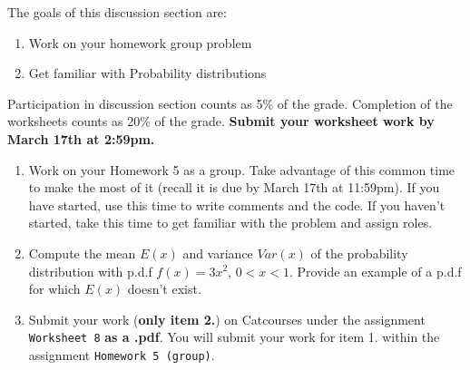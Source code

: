 \documentclass[11pt]{article}
\begin{document}
The goals of this discussion section are: 

\begin{enumerate}
\item Work on your homework group problem
\item Get familiar with Probability distributions
\end{enumerate}

Participation in discussion section counts as 5\% of the grade. Completion of the worksheets counts as 20\% of the grade. \textbf{Submit your worksheet work by March 17th at 2:59pm.}

\begin{enumerate}
\item Work on your Homework 5 as a group. Take advantage of this common time to make the most of it (recall it is due by March 17th at 11:59pm). If you have started, use this time to write comments and the code. If you haven't started, take this time to get familiar with the problem and assign roles.
\item Compute the mean $E(x) $ and variance $Var(x)$ of the probability distribution with p.d.f $f(x) = 3x^2$, $0<x <1$. Provide an example of a p.d.f for which $E(x)$ doesn't exist.
\item Submit your work (\textbf{only item 2.}) on Catcourses under the assignment \texttt{Worksheet 8} \textbf{as a .pdf}. You will submit your work for item 1. within the assignment \texttt{Homework 5 (group)}.
\end{enumerate}
\end{document}
